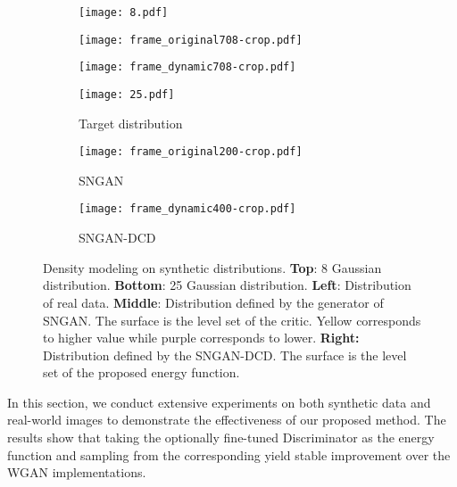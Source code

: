 \documentclass{article}
\begin{document}
\begin{figure*}[!t]
	\centering
	\begin{subfigure}{0.32\linewidth}
    	\texttt{[image: 8.pdf]} 
    \end{subfigure}
    \begin{subfigure}{0.32\linewidth}
		\texttt{[image: frame\_original708-crop.pdf]}
    \end{subfigure}
    \begin{subfigure}{0.32\linewidth}
		\texttt{[image: frame\_dynamic708-crop.pdf]}
    \end{subfigure}
    \begin{subfigure}{0.32\linewidth}
		\texttt{[image: 25.pdf]} 
        \caption{Target distribution}
        \label{subfig:toy:true}
    \end{subfigure}
    \begin{subfigure}{0.32\linewidth}
		\texttt{[image: frame\_original200-crop.pdf]}
        \caption{SNGAN}
        \label{subfig:toy:sngan}
    \end{subfigure}
    \begin{subfigure}{0.32\linewidth}
		\texttt{[image: frame\_dynamic400-crop.pdf]}
        \caption{SNGAN-DCD}
        \label{subfig:toy:sngan-dcd}
    \end{subfigure}
    \caption{Density modeling on synthetic distributions. \textbf{Top}: 8 Gaussian distribution. \textbf{Bottom}: 25 Gaussian distribution. \textbf{Left}: Distribution of real data. \textbf{Middle}: Distribution defined by the generator of SNGAN. The surface is the level set of the critic. Yellow corresponds to higher value while purple corresponds to lower. \textbf{Right:} Distribution defined by the SNGAN-DCD. The surface is the level set of the proposed energy function.}
    \vspace{-5pt}
    \label{fig:toy}
\end{figure*}

In this section, we conduct extensive experiments on both synthetic data and real-world images to demonstrate the effectiveness of our proposed method. The results show that taking the optionally fine-tuned Discriminator as the energy function and sampling from the corresponding  yield stable improvement over the WGAN implementations.  
\end{document}

